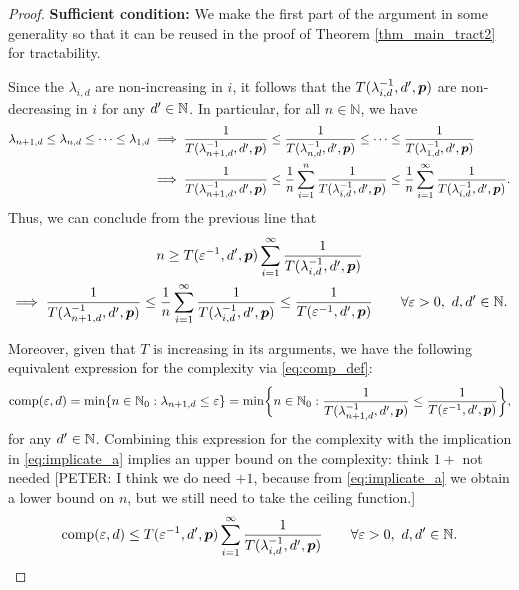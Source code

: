 \documentclass[11pt,a4paper]{article}
\newcommand{\fred}[1]{\begingroup\color{blue}#1\endgroup}
\newcommand{\peter}[1]{\begingroup\color{purple}#1\endgroup}
\begin{document}
\begin{proof}
\textbf{Sufficient condition:}\newline
We make the first part of the argument in some generality so that it can be reused in the proof of Theorem \ref{thm_main_tract2} for tractability.

Since the $\lambda_{i,d}$ are non-increasing in $i$, it follows that the $T(\lambda_{i,d}^{-1},d',\boldsymbol{p})$ are non-decreasing in $i$ \peter{for any $d'\in\mathbb{N}$}. In particular, for all $n\in \mathbb{N}$, we have
\begin{align*}
    \lambda_{n+1,d} \le \lambda_{n,d} \le \cdots \le \lambda_{1,d}
    & \implies \frac{1}{T(\lambda_{n+1, d}^{-1},d',\boldsymbol{p})} \le \frac{1}{T(\lambda_{n, d}^{-1},d',\boldsymbol{p})} \le \cdots \le \frac{1}{T(\lambda_{1, d}^{-1},d',\boldsymbol{p})} \\
    & \implies \frac{1}{T(\lambda_{n+1, d}^{-1},d',\boldsymbol{p}) }
    \le \frac 1n \sum_{i=1}^n  \frac{1}{T(\lambda_{i, d}^{-1},d',\boldsymbol{p}) }
    \le \frac 1n \sum_{i=1}^\infty  \frac{1}{T(\lambda_{i, d}^{-1},d',\boldsymbol{p})}.
\end{align*}
Thus, we can conclude from the previous line that
\begin{multline} \label{eq:implicate_a}
    n \ge T(\varepsilon^{-1},d',\boldsymbol{p}) \sum_{i=1}^\infty \frac{1}{T(\lambda_{i, d}^{-1},d',\boldsymbol{p})} \\
   \implies   \frac{1}{T(\lambda_{n+1, d}^{-1},d',\boldsymbol{p})} \le
   \frac 1n \sum_{i=1}^\infty \frac{1}{T(\lambda_{i, d}^{-1},d',\boldsymbol{p}) } \le \frac{1}{T(\varepsilon^{-1},d',\boldsymbol{p})} \qquad \forall \varepsilon > 0, \ d,d' \in \mathbb{N}.
\end{multline}

Moreover, given that $T$ is increasing in its arguments, we have the following equivalent expression for the complexity via \eqref{eq:comp_def}:
    \begin{equation*} %
    \comp(\varepsilon, d) = \min \{n \in \natzero : \lambda_{n+1, d} \le \varepsilon\} = \min \biggl\{n \in \natzero : \frac{1}{T(\lambda_{n+1,d}^{-1},d',\vp)}\le \frac{1}{T(\varepsilon^{-1},d',\vp) }\biggr\},
\end{equation*}
for any $d' \in \mathbb{N}$.  Combining this expression for the complexity with the implication in \eqref{eq:implicate_a} implies an upper bound on the complexity: \fred{think $1+$ not needed} 
\peter{[PETER: I think we do need $+1$, because from \eqref{eq:implicate_a} we obtain a lower bound on $n$, but we still need to take the ceiling function.]}
\begin{equation} \label{eq:compUP}
	\operatorname{comp}(\varepsilon,d)
	\le T(\varepsilon^{-1},d',\boldsymbol{p}) \sum_{i=1}^\infty \frac{1}{T(\lambda_{i, d}^{-1},d',\boldsymbol{p})} \qquad \forall \varepsilon > 0, \ d, d' \in \mathbb{N}.
\end{equation}


\end{proof}
\end{document}
